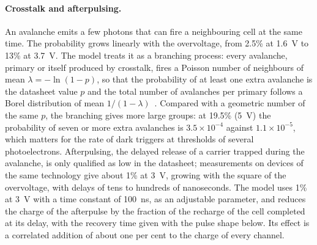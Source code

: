 \documentclass[11pt]{article}
\begin{document}
\paragraph{Crosstalk and afterpulsing.} An avalanche emits a few photons
that can fire a neighbouring cell at the same time. The probability grows
linearly with the overvoltage, from 2.5\% at 1.6~V to 13\% at 3.7~V. The
model treats it as a branching process: every avalanche, primary or itself
produced by crosstalk, fires a Poisson number of neighbours of mean
$\lambda = -\ln(1-p)$, so that the probability of at least one extra
avalanche is the datasheet value $p$ and the total number of avalanches per
primary follows a Borel distribution of mean $1/(1-\lambda)$~\cite{vinogradov}.
Compared with a geometric number of the same $p$, the branching gives more
large groups: at 19.5\% (5~V) the probability of seven or more extra
avalanches is $3.5\times10^{-4}$ against $1.1\times10^{-5}$, which matters
for the rate of dark triggers at thresholds of several photoelectrons. Afterpulsing, the delayed release of a carrier trapped during
the avalanche, is only qualified as low in the datasheet; measurements on
devices of the same technology give about 1\% at 3~V, growing with the
square of the overvoltage, with delays of tens to hundreds of nanoseconds.
The model uses 1\% at 3~V with a time constant of 100~ns, as an adjustable
parameter, and reduces the charge of the afterpulse by the fraction of the
recharge of the cell completed at its delay, with the recovery time given
with the pulse shape below. Its effect is a correlated addition of about
one per cent to the charge of every channel.
\end{document}
